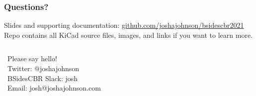 \documentclass[aspectratio=169, t]{beamer}
\begin{document}
\begin{frame}
\frametitle{Questions?}
Slides and supporting documentation: \url{github.com/joshajohnson/bsidescbr2021}\\[10pt]
Repo contains all KiCad source files, images, and links if you want to learn more.\\[10pt]

\begin{columns}
	\ Please say hello!\\[10pt]
	\ Twitter: @\textunderscore joshajohnson\\
	\ BSidesCBR Slack: josh\\
	\ Email: josh@joshajohnson.com\\

	\vspace{-8mm}
	\begin{figure}
	\end{figure}
\end{columns}
\end{frame}
\end{document}
